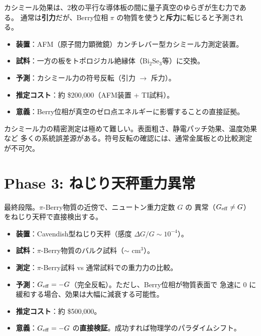 カシミール効果は、2枚の平行な導体板の間に量子真空のゆらぎが生む力である。
通常は\textbf{引力}だが、Berry位相 $\pi$ の物質を使うと\textbf{斥力}に転じると予測される。

\begin{itemize}
  \item \textbf{装置}：AFM（原子間力顕微鏡）カンチレバー型カシミール力測定装置。
  \item \textbf{試料}：一方の板をトポロジカル絶縁体（Bi$_2$Se$_3$等）に交換。
  \item \textbf{予測}：カシミール力の符号反転（引力 $\to$ 斥力）。
  \item \textbf{推定コスト}：約 \$200,000（AFM装置 + TI試料）。
  \item \textbf{意義}：Berry位相が真空のゼロ点エネルギーに影響することの直接証拠。
\end{itemize}

\begin{warningbox}[技術的困難]
カシミール力の精密測定は極めて難しい。表面粗さ、静電パッチ効果、温度効果など
多くの系統誤差源がある。符号反転の確認には、通常金属板との比較測定が不可欠。
\end{warningbox}

\section{Phase 3: ねじり天秤重力異常}
\label{sec:15.5}

最終段階。$\pi$-Berry物質の近傍で、ニュートン重力定数 $G$ の
異常（$G_{\mathrm{eff}} \neq G$）をねじり天秤で直接検出する。

\begin{itemize}
  \item \textbf{装置}：Cavendish型ねじり天秤（感度 $\Delta G/G \sim 10^{-4}$）。
  \item \textbf{試料}：$\pi$-Berry物質のバルク試料（$\sim$ cm$^3$）。
  \item \textbf{測定}：$\pi$-Berry試料 vs 通常試料での重力力の比較。
  \item \textbf{予測}：$G_{\mathrm{eff}} = -G$（完全反転）。ただし、Berry位相が物質表面で
        急速に $0$ に緩和する場合、効果は大幅に減衰する可能性。
  \item \textbf{推定コスト}：約 \$500,000。
  \item \textbf{意義}：$G_{\mathrm{eff}} = -G$ の\textbf{直接検証}。成功すれば物理学のパラダイムシフト。
\end{itemize}

